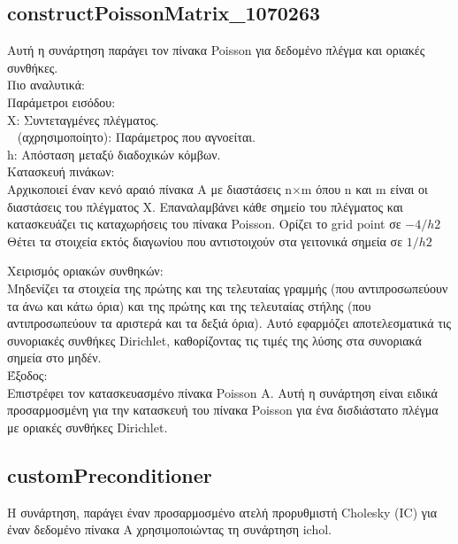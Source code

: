 \documentclass[12pt,a4paper]{article}
\begin{document}
\subsection{constructPoissonMatrix\_1070263}
Αυτή η συνάρτηση παράγει τον πίνακα Poisson για δεδομένο πλέγμα και οριακές συνθήκες. \\

Πιο αναλυτικά:\\
Παράμετροι εισόδου:\\
X: Συντεταγμένες πλέγματος.\\
\texttt{~} (αχρησιμοποίητο): Παράμετρος που αγνοείται.\\
h: Απόσταση μεταξύ διαδοχικών κόμβων.\\

Κατασκευή πινάκων:\\
Αρχικοποιεί έναν κενό αραιό πίνακα A με διαστάσεις n×m όπου n και m είναι οι διαστάσεις του πλέγματος X. Επαναλαμβάνει κάθε σημείο του πλέγματος και κατασκευάζει τις καταχωρήσεις του πίνακα Poisson.
Ορίζει το grid point σε $-4/h2$
Θέτει τα στοιχεία εκτός διαγωνίου που αντιστοιχούν στα γειτονικά σημεία σε $1/h2$\\

Χειρισμός οριακών συνθηκών:\\
Μηδενίζει τα στοιχεία της πρώτης και της τελευταίας γραμμής (που αντιπροσωπεύουν τα άνω και κάτω όρια) και της πρώτης και της τελευταίας στήλης (που αντιπροσωπεύουν τα αριστερά και τα δεξιά όρια). Αυτό εφαρμόζει αποτελεσματικά τις συνοριακές συνθήκες Dirichlet, καθορίζοντας τις τιμές της λύσης στα συνοριακά σημεία στο μηδέν.\\

Έξοδος:\\
Επιστρέφει τον κατασκευασμένο πίνακα Poisson A.
Αυτή η συνάρτηση είναι ειδικά προσαρμοσμένη για την κατασκευή του πίνακα Poisson για ένα δισδιάστατο πλέγμα με οριακές συνθήκες Dirichlet.

\subsection{customPreconditioner}
H συνάρτηση, παράγει έναν προσαρμοσμένο ατελή προρυθμιστή Cholesky (IC) για έναν δεδομένο πίνακα A χρησιμοποιώντας τη συνάρτηση ichol.\\
\end{document}

